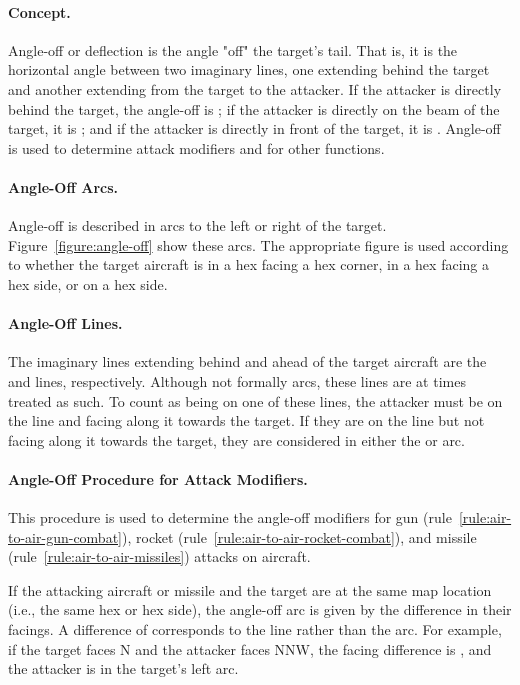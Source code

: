 {{}{

\paragraph{Concept.} Angle-off or deflection is the angle "off" the target's tail. That is, it is the horizontal angle between two imaginary lines, one extending behind the target and another extending from the target to the attacker. If the attacker is directly behind the target, the angle-off is ; if the attacker is directly on the beam of the target, it is ; and if the attacker is directly in front of the target, it is . Angle-off is used to determine attack modifiers and for other functions. 

\paragraph{Angle-Off Arcs.} Angle-off is described in  arcs to the left or right of the target. Figure~\ref{figure:angle-off} show these arcs. The appropriate figure is used according to whether the target aircraft is in a hex facing a hex corner, in a hex facing a hex side, or on a hex side.

\paragraph{Angle-Off Lines.} The imaginary lines extending behind and ahead of the target aircraft are the  and  lines, respectively. Although not formally arcs, these lines are at times treated as such. To count as being on one of these lines, the attacker must be on the line and facing along it towards the target. If they are on the line but not facing along it towards the target, they are considered in either the  or  arc.

\paragraph{Angle-Off Procedure for Attack Modifiers.}
This procedure is used to determine the angle-off modifiers for gun (rule~\ref{rule:air-to-air-gun-combat}), rocket (rule~\ref{rule:air-to-air-rocket-combat}), and missile (rule~\ref{rule:air-to-air-missiles}) attacks on aircraft.

If the attacking aircraft or missile and the target are at the same map location (i.e., the same hex or hex side), the angle-off arc is given by the difference in their facings. A difference of  corresponds to the  line rather than the  arc. For example, if the target faces N and the attacker faces NNW, the facing difference is , and the attacker is in the target's left  arc.

}}
